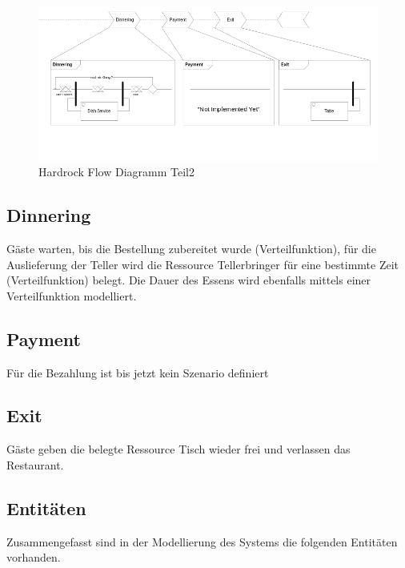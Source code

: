 \documentclass[ngerman,a4paper,12pt]{scrreprt}
\begin{document}
\begin{landscape}
		
		\begin{figure}[H]
				\includegraphics[width=1.4\textwidth]{img/flowDiagramm2-v1.png}
				\caption[Hardrock Flow Diagramm Teil2]{Hardrock Flow Diagramm Teil2}
				\label{flowDiagramm2}
		\end{figure}
		
		\subsection{Dinnering}
		Gäste warten, bis die Bestellung zubereitet wurde (Verteilfunktion), für die Auslieferung der Teller wird die Ressource Tellerbringer für eine bestimmte Zeit (Verteilfunktion) belegt. Die Dauer des Essens wird ebenfalls mittels einer Verteilfunktion modelliert.
		
		\subsection{Payment}
		Für die Bezahlung ist bis jetzt kein Szenario definiert
		
		\subsection{Exit}
		Gäste geben die belegte Ressource Tisch wieder frei und verlassen das Restaurant.
		
\end{landscape}

		\subsection{Entitäten}
		Zusammengefasst sind in der Modellierung des Systems die folgenden Entitäten vorhanden.
		
\end{document}
